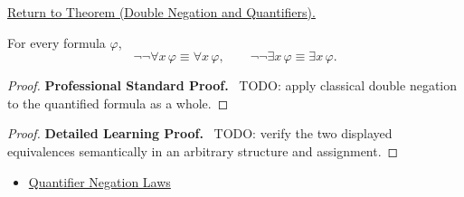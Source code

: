 \newpage
{}
\label{prf:quantifier-double-negation}

\begin{remark*}[Return]
\hyperref[thm:quantifier-double-negation]{Return to Theorem (Double Negation and Quantifiers).}
\end{remark*}

\begin{theorem*}
For every formula \(\varphi\),
\[
\neg\neg\forall x\,\varphi \equiv \forall x\,\varphi,
\qquad
\neg\neg\exists x\,\varphi \equiv \exists x\,\varphi.
\]
\end{theorem*}

\begin{proof}
\textbf{Professional Standard Proof.}~
TODO: apply classical double negation to the quantified formula as a whole.
\end{proof}

\begin{proof}
\textbf{Detailed Learning Proof.}~
TODO: verify the two displayed equivalences semantically in an arbitrary
structure and assignment.
\end{proof}

\begin{remark*}
\end{remark*}

\begin{dependencies}
\begin{itemize}
  \item \hyperref[thm:qneg]{Quantifier Negation Laws}
\end{itemize}
\end{dependencies}

\clearpage

